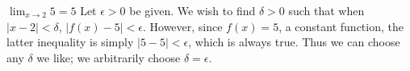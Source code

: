 {$\displaystyle \lim_{x\to 2} 5 = 5$}
{Let $\epsilon >0$ be given. We wish to find $\delta >0$ such that when $|x-2|<\delta$, $|f(x)-5|<\epsilon$. However, since $f(x)=5$, a constant function, the latter inequality is simply $|5-5|<\epsilon$, which is always true. Thus we can choose any $\delta$ we like; we arbitrarily choose $\delta =\epsilon$. 
}
